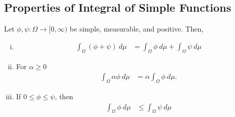 \documentclass[9pt]{extarticle}
\begin{document}
  \subsection{Properties of Integral of Simple Functions}%
  Let $\phi,\psi: \Omega \rightarrow [0,\infty)$ be simple, measurable, and positive. Then,
  \begin{enumerate}[(i)]
    \item 
      \begin{align*}
        \int_{\Omega}(\phi + \psi)~d\mu &= \int_{\Omega}\phi~d\mu + \int_{\Omega}\psi~d\mu
      \end{align*}
    \item For $\alpha \geq 0$
      \begin{align*}
        \int_{\Omega}\alpha\phi~d\mu &= \alpha \int_{\Omega}\phi~d\mu.
      \end{align*}
    \item If $0 \leq \phi \leq \psi$, then
      \begin{align*}
        \int_{\Omega}\phi~d\mu &\leq \int_{\Omega}\psi~d\mu
      \end{align*}
  \end{enumerate}
\end{document}
